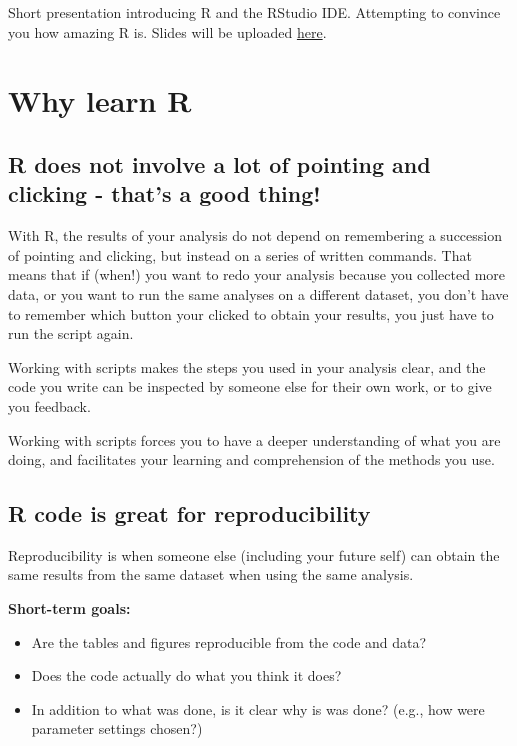 \documentclass[]{book}
\providecommand{\tightlist}{%
  \setlength{\itemsep}{0pt}\setlength{\parskip}{0pt}}
\begin{document}
Short presentation introducing R and the RStudio IDE. Attempting to convince you how amazing R is. Slides will be uploaded \href{intro.pdf}{here}.

\hypertarget{why-learn-r}{%
\section{Why learn R}\label{why-learn-r}}

\hypertarget{r-does-not-involve-a-lot-of-pointing-and-clicking---thats-a-good-thing}{%
\subsection*{R does not involve a lot of pointing and clicking - that's a good thing!}\label{r-does-not-involve-a-lot-of-pointing-and-clicking---thats-a-good-thing}}

With R, the results of your analysis do not depend on remembering a succession of pointing and clicking, but instead on a series of written commands. That means that if (when!) you want to redo your analysis because you collected more data, or you want to run the same analyses on a different dataset, you don't have to remember which button your clicked to obtain your results, you just have to run the script again.

Working with scripts makes the steps you used in your analysis clear, and the code you write can be inspected by someone else for their own work, or to give you feedback.

Working with scripts forces you to have a deeper understanding of what you are doing, and facilitates your learning and comprehension of the methods you use.

\hypertarget{r-code-is-great-for-reproducibility}{%
\subsection*{R code is great for reproducibility}\label{r-code-is-great-for-reproducibility}}

Reproducibility is when someone else (including your future self) can obtain the same results from the same dataset when using the same analysis.

\textbf{Short-term goals:}

\begin{itemize}
\tightlist
\item
  Are the tables and figures reproducible from the code and data?\\
\item
  Does the code actually do what you think it does?\\
\item
  In addition to what was done, is it clear why is was done? (e.g., how were parameter settings chosen?)
\end{itemize}
\end{document}
